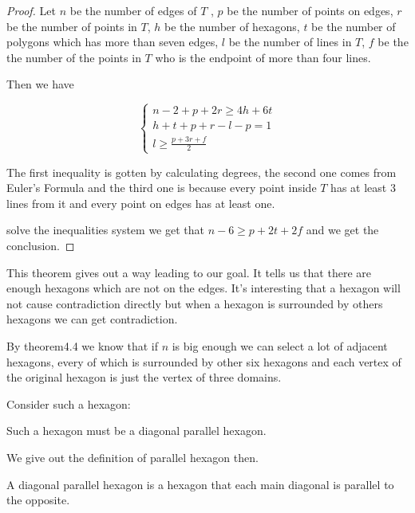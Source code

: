 \begin{proof}
	Let $n$ be the number of edges of $T$ , $p$ be the number of points
	on edges, $r$ be the number of points in $T$, $h$ be the number of 
	hexagons, $t$ be the number of polygons which has more than seven 
	edges, $l$ be the number of lines in $T$, $f$ be the the number of 
	the points in $T$ who is the endpoint of more than four lines.
		
	Then we have
		
\[
	\begin{cases}
		n - 2 + p + 2r \geq 4h + 6t\\
		h + t + p + r - l - p = 1 \\
		l \geq \frac{p + 3r + f}{2}
	\end{cases}
\]
		
	The first inequality is gotten by calculating degrees, 
	the second one comes from  Euler's Formula and the third one 
	is because every point inside $T$ has at least 3 lines from it 
	and every point on edges has at least one.
		
	solve the inequalities system we get that $n - 6 \geq p + 2t + 2f$ and
	we get the conclusion.
\end{proof}	
	
This theorem gives out a way leading to our goal. It tells us 
that there are enough hexagons which are not on the edges. It's 
interesting that a hexagon will not cause contradiction directly 
but when a hexagon is surrounded by others hexagons we can get 
contradiction.
	
	
By theorem4.4 we know that if $n$ is big enough we can select a 
lot of adjacent hexagons, every of which is surrounded by other 
six hexagons and each vertex of the original hexagon is just the
vertex of three domains.
	
Consider such a hexagon:
	
\begin{thm}
	Such a hexagon must be a diagonal parallel hexagon.
\end{thm}	 
	
We give out the definition of parallel hexagon then.

\begin{defn}
	A diagonal parallel hexagon is a hexagon that each main 
	diagonal is parallel to the opposite.
\end{defn}
	


